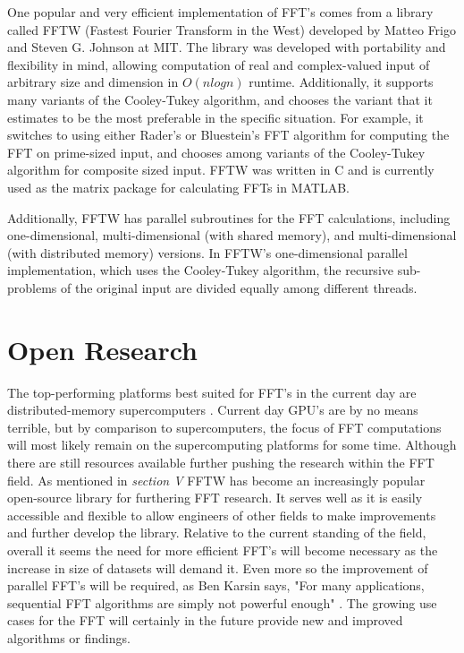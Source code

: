 \documentclass[journal]{IEEEtran}
\begin{document}
	\cite{Beaudoin}
	\par{
		One popular and very efficient implementation of FFT's comes from a library
		called FFTW (Fastest Fourier Transform in the West) developed by Matteo 
		Frigo and Steven G. Johnson at MIT. The library was developed with
		portability and flexibility in mind, allowing computation of real and
		complex-valued input of arbitrary size and dimension in $O(nlogn)$ runtime.
		Additionally, it supports many variants of the Cooley-Tukey algorithm,
		and chooses the variant that it estimates to be the most preferable in
		the specific situation. For example, it switches to using either Rader's
		or Bluestein's FFT algorithm for computing the FFT on prime-sized input, and
		chooses among variants of the Cooley-Tukey algorithm for composite sized
		input. FFTW was written in C and is currently used as the matrix package
		for calculating FFTs in MATLAB.

		Additionally, FFTW has parallel subroutines for the FFT calculations,
		including one-dimensional, multi-dimensional (with shared memory), and
		multi-dimensional (with distributed memory) versions. In FFTW's
		one-dimensional parallel implementation, which uses the Cooley-Tukey
		algorithm, the recursive sub-problems of the original input are divided
		equally among different threads.
		\cite{FFTW}
	}
\section{Open Research}
	\par{
		The top-performing platforms best suited for FFT's in the current day are 
		distributed-memory supercomputers \cite{FFTLitReview}. Current day GPU's 
		are by no means terrible, but by comparison to supercomputers,
		the focus of FFT computations will most likely remain on the supercomputing 
		platforms for some time. Although there are still resources available further 
		pushing the research within the FFT field. As mentioned in \textit{section V} FFTW
		has become an increasingly popular open-source library for furthering FFT research.
		It serves well as it is easily accessible and flexible to allow engineers of other
		fields to make improvements and further develop the library. Relative to the 
		current standing of the field, overall it seems the need for more efficient FFT's 
		will become necessary as the increase in size of datasets will demand it. Even more so 
		the improvement of parallel FFT's will be required, as Ben Karsin says,
		"For many applications, sequential FFT algorithms are simply not powerful enough" \cite{FFTLitReview}.
		The growing use cases for the FFT will certainly in the future provide new and improved 
		algorithms or findings.
	}
\end{document}
